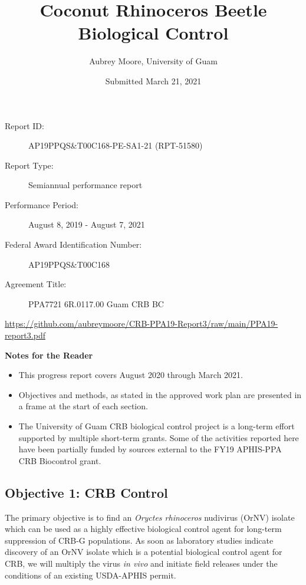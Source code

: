 \documentclass[12pt,letterpaper,english,bibliography=totocnumbered,abstract=on]{scrartcl}
\begin{document}
\titlehead{USDA-APHIS Progress Report}
\title{Coconut Rhinoceros Beetle Biological Control}
\author{Aubrey Moore, University of Guam}
\date{Submitted March 21, 2021}
\maketitle
\begin{description}	
	\item[Report ID:] AP19PPQS\&T00C168-PE-SA1-21 (RPT-51580)
	\item[Report Type:] Semiannual performance report
	\item[Performance Period:] August 8, 2019 - August 7, 2021
	\item[Federal Award Identification Number:] AP19PPQS\&T00C168
	\item[Agreement Title:] PPA7721 6R.0117.00 Guam CRB BC
\end{description}

\begin{footnotesize}
\url{https://github.com/aubreymoore/CRB-PPA19-Report3/raw/main/PPA19-report3.pdf}
\end{footnotesize}

\newpage{}
\tableofcontents{}

\clearpage
\textbf{Notes for the Reader}
\begin{itemize}	
	\item This progress report covers August 2020 through March 2021.	
	\item Objectives and methods, as stated in the approved work plan \cite{mooreWorkPlanAPHISPPA2020} are presented in a frame at the start of each section. 	
	\item The University of Guam CRB biological control project is a long-term effort supported by multiple short-term grants. Some of the activities reported here have been partially funded by sources external to the FY19 APHIS-PPA CRB Biocontrol grant.  	
\end{itemize}


\newpage

\listoftodos

\newpage

\begin{framed}
\section{Objective 1: CRB Control}

The primary objective is to find an \textit{Oryctes rhinoceros} nudivirus (OrNV) isolate which can be used as a highly effective biological control agent for long-term suppression of CRB-G populations. As soon as laboratory studies indicate discovery of an OrNV isolate which is a potential biological control agent for CRB, we will multiply the virus \textit{in vivo} and initiate field releases under the conditions of an existing USDA-APHIS permit.
\end{framed}
\end{document}
